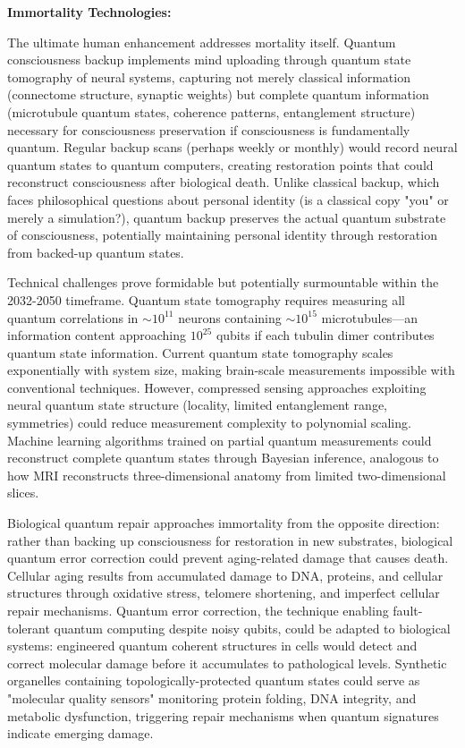 \documentclass[11pt,a4paper,twoside]{article}
\begin{document}
\textbf{Immortality Technologies:}

The ultimate human enhancement addresses mortality itself. Quantum consciousness backup implements mind uploading through quantum state tomography of neural systems, capturing not merely classical information (connectome structure, synaptic weights) but complete quantum information (microtubule quantum states, coherence patterns, entanglement structure) necessary for consciousness preservation if consciousness is fundamentally quantum. Regular backup scans (perhaps weekly or monthly) would record neural quantum states to quantum computers, creating restoration points that could reconstruct consciousness after biological death. Unlike classical backup, which faces philosophical questions about personal identity (is a classical copy "you" or merely a simulation?), quantum backup preserves the actual quantum substrate of consciousness, potentially maintaining personal identity through restoration from backed-up quantum states.

Technical challenges prove formidable but potentially surmountable within the 2032-2050 timeframe. Quantum state tomography requires measuring all quantum correlations in $\sim 10^{11}$ neurons containing $\sim 10^{15}$ microtubules---an information content approaching $10^{25}$ qubits if each tubulin dimer contributes quantum state information. Current quantum state tomography scales exponentially with system size, making brain-scale measurements impossible with conventional techniques. However, compressed sensing approaches exploiting neural quantum state structure (locality, limited entanglement range, symmetries) could reduce measurement complexity to polynomial scaling. Machine learning algorithms trained on partial quantum measurements could reconstruct complete quantum states through Bayesian inference, analogous to how MRI reconstructs three-dimensional anatomy from limited two-dimensional slices.

Biological quantum repair approaches immortality from the opposite direction: rather than backing up consciousness for restoration in new substrates, biological quantum error correction could prevent aging-related damage that causes death. Cellular aging results from accumulated damage to DNA, proteins, and cellular structures through oxidative stress, telomere shortening, and imperfect cellular repair mechanisms. Quantum error correction, the technique enabling fault-tolerant quantum computing despite noisy qubits, could be adapted to biological systems: engineered quantum coherent structures in cells would detect and correct molecular damage before it accumulates to pathological levels. Synthetic organelles containing topologically-protected quantum states could serve as "molecular quality sensors" monitoring protein folding, DNA integrity, and metabolic dysfunction, triggering repair mechanisms when quantum signatures indicate emerging damage.
\end{document}
